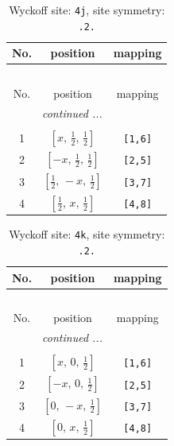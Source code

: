 \documentclass[fleqn,8pt]{jsarticle}
\begin{document}
\begin{longtable}{ccc}
\caption{Wyckoff site: {\tt 4j}, site symmetry: {\tt .2.}}
 \\
 \hline \hline
No. & position & mapping \\ \hline \endfirsthead

\multicolumn{2}{l}{\tablename\ \thetable{}} \\
 \hline \hline
No. & position & mapping \\ \hline \endhead

 \hline \hline
\multicolumn{2}{r}{\footnotesize\it continued ...} \\ \endfoot

 \hline \hline
\multicolumn{2}{r}{} \\ \endlastfoot

1 & $\left[ x,\, \frac{1}{2},\, \frac{1}{2} \right]$ & {\tt [1,6]} \\ \hline
2 & $\left[ - x,\, \frac{1}{2},\, \frac{1}{2} \right]$ & {\tt [2,5]} \\ \hline
3 & $\left[ \frac{1}{2},\, - x,\, \frac{1}{2} \right]$ & {\tt [3,7]} \\ \hline
4 & $\left[ \frac{1}{2},\, x,\, \frac{1}{2} \right]$ & {\tt [4,8]} \\
\end{longtable}
\renewcommand{\arraystretch}{1.2}
\begin{longtable}{ccc}
\caption{Wyckoff site: {\tt 4k}, site symmetry: {\tt .2.}}
 \\
 \hline \hline
No. & position & mapping \\ \hline \endfirsthead

\multicolumn{2}{l}{\tablename\ \thetable{}} \\
 \hline \hline
No. & position & mapping \\ \hline \endhead

 \hline \hline
\multicolumn{2}{r}{\footnotesize\it continued ...} \\ \endfoot

 \hline \hline
\multicolumn{2}{r}{} \\ \endlastfoot

1 & $\left[ x,\, 0,\, \frac{1}{2} \right]$ & {\tt [1,6]} \\ \hline
2 & $\left[ - x,\, 0,\, \frac{1}{2} \right]$ & {\tt [2,5]} \\ \hline
3 & $\left[ 0,\, - x,\, \frac{1}{2} \right]$ & {\tt [3,7]} \\ \hline
4 & $\left[ 0,\, x,\, \frac{1}{2} \right]$ & {\tt [4,8]} \\
\end{longtable}
\end{document}
